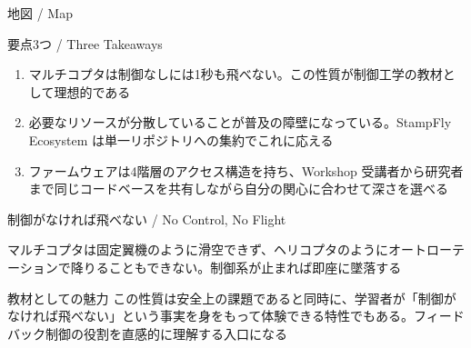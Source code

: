 
\begin{frame}{地図 / Map}
  \centering
  \vspace{-1mm}
\end{frame}

\begin{frame}{要点3つ / Three Takeaways}
  \begin{enumerate}
    \item マルチコプタは制御なしには1秒も飛べない。この性質が制御工学の教材として理想的である
    \item 必要なリソースが分散していることが普及の障壁になっている。StampFly Ecosystem は単一リポジトリへの集約でこれに応える
    \item ファームウェアは4階層のアクセス構造を持ち、Workshop 受講者から研究者まで同じコードベースを共有しながら自分の関心に合わせて深さを選べる
  \end{enumerate}
\end{frame}

\begin{frame}{制御がなければ飛べない / No Control, No Flight}
  \vspace{0.3em}

  \small マルチコプタは固定翼機のように滑空できず、ヘリコプタのようにオートローテーションで降りることもできない。制御系が止まれば即座に墜落する

  \vspace{0.5em}

  \begin{exampleblock}{教材としての魅力}
    \small この性質は安全上の課題であると同時に、学習者が「制御がなければ飛べない」という事実を身をもって体験できる特性でもある。フィードバック制御の役割を直感的に理解する入口になる
  \end{exampleblock}
\end{frame}

